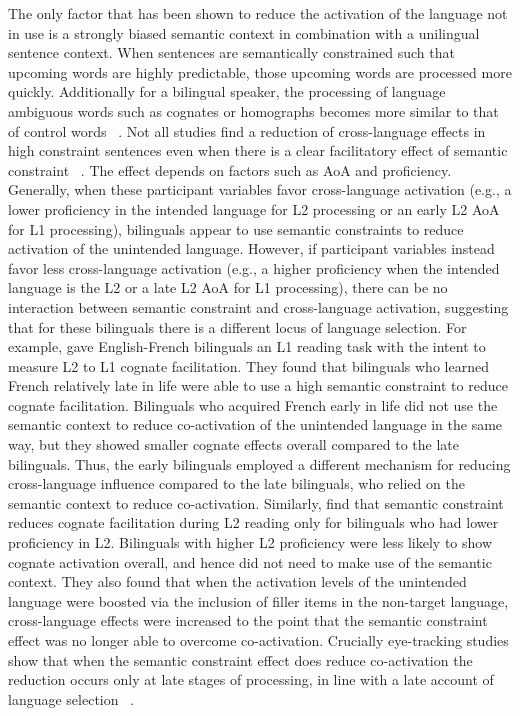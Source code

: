 The only factor that has been shown to reduce the activation of the language not in use is a strongly biased semantic context in combination with a unilingual sentence context. When sentences are semantically constrained such that upcoming words are highly predictable, those upcoming words are processed more quickly. Additionally for a bilingual speaker, the processing of language ambiguous words such as cognates or homographs becomes more similar to that of control words ~\citep[e.g.,][]{Libben2009, Schwartz2006, VanHell2008}. Not all studies find a reduction of cross-language effects in high constraint sentences even when there is a clear facilitatory effect of semantic constraint ~\citep[e.g.,][]{VanAssche2010}. The effect depends on factors such as AoA and proficiency. Generally, when these participant variables favor cross-language activation (e.g., a lower proficiency in the intended language for L2 processing or an early L2 AoA for L1 processing), bilinguals appear to use semantic constraints to reduce activation of the unintended language. However, if participant variables instead favor less cross-language activation (e.g., a higher proficiency when the intended language is the L2 or a late L2 AoA for L1 processing), there can be no interaction between semantic constraint and cross-language activation, suggesting that for these bilinguals there is a different locus of language selection. For example,  \citet{Titone2011} gave English-French bilinguals an L1 reading task with the intent to measure L2 to L1 cognate facilitation. They found that bilinguals who learned French relatively late in life were able to use a high semantic constraint to reduce cognate facilitation. Bilinguals who acquired French early in life did not use the semantic context to reduce co-activation of the unintended language in the same way, but they showed smaller cognate effects overall compared to the late bilinguals. Thus, the early bilinguals employed a different mechanism for reducing cross-language influence compared to the late bilinguals, who relied on the semantic context to reduce co-activation. Similarly,  \citet{Pivneva2014} find that semantic constraint reduces cognate facilitation during L2 reading only for bilinguals who had lower proficiency in L2. Bilinguals with higher L2 proficiency were less likely to show cognate activation overall, and hence did not need to make use of the semantic context. They also found that when the activation levels of the unintended language were boosted via the inclusion of filler items in the non-target language, cross-language effects were increased to the point that the semantic constraint effect was no longer able to overcome co-activation. Crucially eye-tracking studies show that when the semantic constraint effect does reduce co-activation the reduction occurs only at late stages of processing, in line with a late account of language selection ~\citep{Libben2009}.

